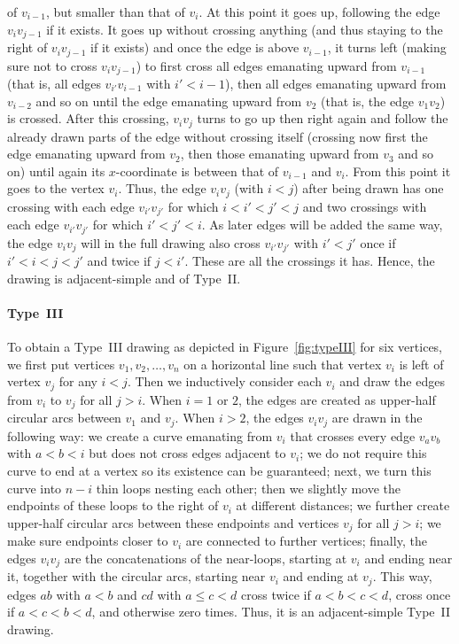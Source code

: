 \documentclass[a4paper,UKenglish,cleveref, autoref, thm-restate]{lipics_arxiv}
\begin{document}
of $v_{i-1}$, but smaller than that of $v_i$. At this point it goes up, following the edge $v_iv_{j-1}$ if it exists. It goes up without crossing anything (and thus staying to the right of $v_iv_{j-1}$ if it exists) and once the edge is above $v_{i-1}$, it turns left (making sure not to cross $v_iv_{j-1}$) to first cross all edges emanating upward from $v_{i-1}$ (that is, all edges $v_{i'}v_{i-1}$ with $i'<i-1$), then all edges emanating upward from $v_{i-2}$ and so on until the edge emanating upward from $v_2$ (that is, the edge $v_1v_2$) is crossed. After this crossing, $v_iv_j$ turns to go up then right again and follow the already drawn parts of the edge  without crossing itself (crossing now first the edge emanating upward from $v_2$, then those emanating upward from $v_3$ and so on) until again its $x$-coordinate is between that of $v_{i-1}$ and $v_i$. From this point it goes to the vertex $v_i$. Thus, the edge $v_iv_j$ (with $i<j$) after being drawn has one crossing with each edge $v_{i'}v_{j'}$ for which $i<i'<j'<j$ and two crossings with each edge $v_{i'}v_{j'}$ for which $i'<j'<i$. As later edges will be added the same way, the edge $v_iv_j$ will in the full drawing also cross $v_{i'}v_{j'}$ with $i'<j'$ once if $i'<i<j<j'$ and twice if $j<i'$. These are all the crossings it has. Hence, the drawing is adjacent-simple and of Type~II. 
   
\paragraph*{Type~III}
 To obtain a Type~III drawing as depicted in Figure~\ref{fig:typeIII} for six vertices, we first put vertices $v_1,v_2,\dots,v_n$ on a horizontal line such that vertex $v_i$ is left of vertex $v_j$ for any $i<j$. Then we inductively consider each $v_i$ and draw the edges from $v_i$ to $v_j$ for all $j > i$. When $i=1$ or $2$, the edges are created as upper-half circular arcs between $v_1$ and $v_j$. When $i > 2$, the edges $v_iv_j$ are drawn in the following way: we create a curve emanating from $v_i$ that crosses every edge $v_av_b$ with $a<b<i$ but does not cross edges adjacent to $v_i$; we do not require this curve to end at a vertex so its existence can be guaranteed; next, we turn this curve into $n-i$ thin loops nesting each other; then we slightly move the endpoints of these loops to the right of $v_i$ at different distances; we further create upper-half circular arcs between these endpoints and vertices $v_j$ for all $j > i$; we make sure endpoints closer to $v_i$ are connected to further vertices; finally, the edges $v_iv_j$ are the concatenations of the near-loops, starting at $v_i$ and ending near it, together with the circular arcs, starting near $v_i$ and ending at $v_j$.
This way, edges $ab$ with $a<b$ and $cd$ with $a \le c<d$ cross twice if $a<b<c<d$, cross once if $a<c<b<d$, and otherwise zero times. Thus, it is an adjacent-simple Type~II drawing.
\fi
\end{document}
